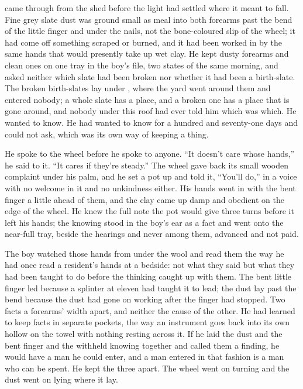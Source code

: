  came through from the shed before the light had settled where it meant to fall. Fine grey slate dust was ground small as meal into both forearms past the bend of the little finger and under the nails, not the bone-coloured slip of the wheel; it had come off something scraped or burned, and it had been worked in by the same hands that would presently take up wet clay. He kept dusty forearms and clean ones on one tray in the boy's file, two states of the same morning, and asked neither which slate had been broken nor whether it had been a birth-slate. The broken birth-slates lay under , where the yard went around them and entered nobody; a whole slate has a place, and a broken one has a place that is gone around, and nobody under this roof had ever told him which was which. He wanted to know. He had wanted to know for a hundred and seventy-one days and could not ask, which was its own way of keeping a thing.

He spoke to the wheel before he spoke to anyone. “It doesn't care whose hands,” he said to it. “It cares if they're steady.” The wheel gave back its small wooden complaint under his palm, and he set a pot up and told it, “You'll do,” in a voice with no welcome in it and no unkindness either. His hands went in with the bent finger a little ahead of them, and the clay came up damp and obedient on the edge of the wheel. He knew the full note the pot would give three turns before it left his hands; the knowing stood in the boy's ear as a fact and went onto the near-full tray, beside the hearings and never among them, advanced and not paid.

The boy watched those hands from under the wool and read them the way he had once read a resident's hands at a bedside: not what they said but what they had been taught to do before the thinking caught up with them. The bent little finger led because a splinter at eleven had taught it to lead; the dust lay past the bend because the dust had gone on working after the finger had stopped. Two facts a forearms' width apart, and neither the cause of the other. He had learned to keep facts in separate pockets, the way an instrument goes back into its own hollow on the towel with nothing resting across it. If he laid the dust and the bent finger and the withheld knowing together and called them a finding, he would have a man he could enter, and a man entered in that fashion is a man who can be spent. He kept the three apart. The wheel went on turning and the dust went on lying where it lay.

